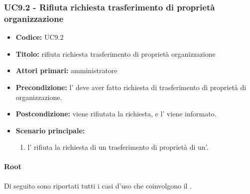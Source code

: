 \documentclass[casi-duso]{subfiles}
\begin{document}
\subsubsection{UC9.2 - Rifiuta richiesta trasferimento di proprietà organizzazione}
\label{subsub:UC9.2}
\begin{itemize}
  \item \textbf{Codice:} UC9.2
  \item \textbf{Titolo:} rifiuta richiesta trasferimento di proprietà organizzazione
  \item \textbf{Attori primari:} amministratore
  \item \textbf{Precondizione:} l' deve aver fatto richiesta di trasferimento di proprietà di organizzazione.
  \item \textbf{Postcondizione:} viene rifiutata la richiesta, e l' viene informato.
  \item \textbf{Scenario principale:} 
  \begin{enumerate}
    \item  l' rifiuta la richiesta di un trasferimento di proprietà di un'.
  \end{enumerate}
\end{itemize}

\paragraph{Root}
Di seguito sono riportati tutti i casi d'uso che coinvolgono il  .
\end{document}
